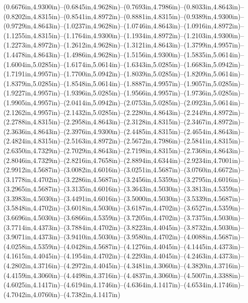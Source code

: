 (0.6676in,4.9300in)--(0.6845in,4.9628in)--(0.7693in,4.7986in)--(0.8033in,4.8643in)--(0.8202in,4.8315in)--(0.8541in,4.8972in)--(0.8881in,4.8315in)--(0.9389in,4.9300in)--(0.9729in,4.8643in)--(1.0237in,4.9628in)--(1.0746in,4.8643in)--(1.0916in,4.8972in)--(1.1255in,4.8315in)--(1.1764in,4.9300in)--(1.1934in,4.8972in)--(1.2103in,4.9300in)--(1.2273in,4.8972in)--(1.2612in,4.9628in)--(1.3121in,4.8643in)--(1.3799in,4.9957in)--(1.4478in,4.8643in)--(1.4986in,4.9628in)--(1.5156in,4.9300in)--(1.5835in,5.0614in)--(1.6004in,5.0285in)--(1.6174in,5.0614in)--(1.6343in,5.0285in)--(1.6683in,5.0942in)--(1.7191in,4.9957in)--(1.7700in,5.0942in)--(1.8039in,5.0285in)--(1.8209in,5.0614in)--(1.8379in,5.0285in)--(1.8548in,5.0614in)--(1.8887in,4.9957in)--(1.9057in,5.0285in)--(1.9227in,4.9957in)--(1.9396in,5.0285in)--(1.9566in,4.9957in)--(1.9736in,5.0285in)--(1.9905in,4.9957in)--(2.0414in,5.0942in)--(2.0753in,5.0285in)--(2.0923in,5.0614in)--(2.1262in,4.9957in)--(2.1432in,5.0285in)--(2.2280in,4.8643in)--(2.2449in,4.8972in)--(2.2788in,4.8315in)--(2.2958in,4.8643in)--(2.3128in,4.8315in)--(2.3467in,4.8972in)--(2.3636in,4.8643in)--(2.3976in,4.9300in)--(2.4485in,4.8315in)--(2.4654in,4.8643in)--(2.4824in,4.8315in)--(2.5163in,4.8972in)--(2.5672in,4.7986in)--(2.5841in,4.8315in)--(2.6350in,4.7329in)--(2.7029in,4.8643in)--(2.7198in,4.8315in)--(2.7368in,4.8643in)--(2.8046in,4.7329in)--(2.8216in,4.7658in)--(2.8894in,4.6344in)--(2.9234in,4.7001in)--(2.9912in,4.5687in)--(3.0082in,4.6016in)--(3.0251in,4.5687in)--(3.0760in,4.6672in)--(3.1778in,4.4702in)--(3.2286in,4.5687in)--(3.2456in,4.5359in)--(3.2795in,4.6016in)--(3.2965in,4.5687in)--(3.3135in,4.6016in)--(3.3643in,4.5030in)--(3.3813in,4.5359in)--(3.3983in,4.5030in)--(3.4491in,4.6016in)--(3.5000in,4.5030in)--(3.5339in,4.5687in)--(3.5848in,4.4702in)--(3.6018in,4.5030in)--(3.6187in,4.4702in)--(3.6527in,4.5359in)--(3.6696in,4.5030in)--(3.6866in,4.5359in)--(3.7205in,4.4702in)--(3.7375in,4.5030in)--(3.7714in,4.4373in)--(3.7884in,4.4702in)--(3.8223in,4.4045in)--(3.8732in,4.5030in)--(3.9071in,4.4373in)--(3.9410in,4.5030in)--(3.9580in,4.4702in)--(4.0088in,4.5687in)--(4.0258in,4.5359in)--(4.0428in,4.5687in)--(4.1276in,4.4045in)--(4.1445in,4.4373in)--(4.1615in,4.4045in)--(4.1954in,4.4702in)--(4.2293in,4.4045in)--(4.2463in,4.4373in)--(4.2802in,4.3716in)--(4.2972in,4.4045in)--(4.3481in,4.3060in)--(4.3820in,4.3716in)--(4.4159in,4.3060in)--(4.4498in,4.3716in)--(4.4837in,4.3060in)--(4.5007in,4.3388in)--(4.6025in,4.1417in)--(4.6194in,4.1746in)--(4.6364in,4.1417in)--(4.6534in,4.1746in)--(4.7042in,4.0760in)--(4.7382in,4.1417in) 